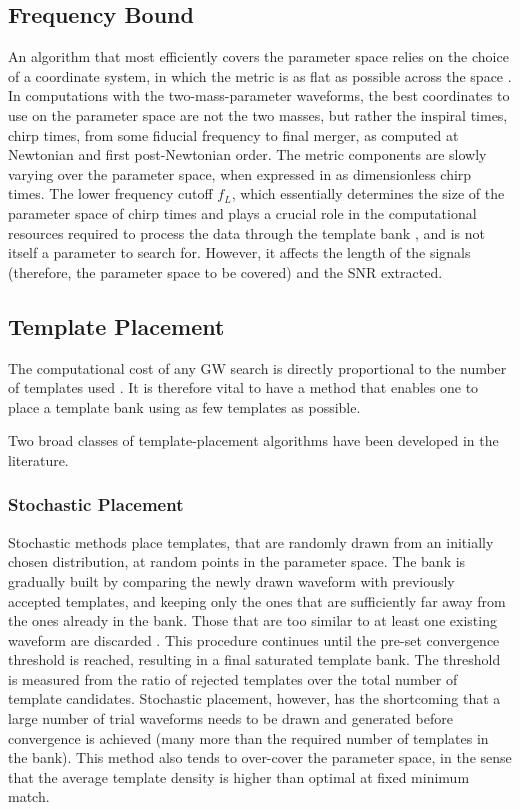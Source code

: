 \documentclass[binding=0.6cm, LaM]{sapthesis}
\begin{document}
\subsection{Frequency Bound}
	An algorithm that most efficiently covers the parameter space relies on the choice of a coordinate system, 
	in which the metric is as flat as possible across the space \cite{34}.
	In computations with the two-mass-parameter waveforms, 
	the best coordinates to use on the parameter space are not the two masses, 
	but rather the inspiral times, chirp times, from some fiducial frequency to final merger, 
	as computed at Newtonian and first post-Newtonian order. 
	The metric components are slowly varying over the parameter space, 
	when expressed in as dimensionless chirp times. 
        The lower frequency cutoff $f_L$, which essentially determines the size of the parameter space
        of chirp times and plays a crucial role in the computational resources required
        to process the data through the template bank \cite{30}, and is not itself a parameter to search for.
        However, it affects the length of the signals
        (therefore, the parameter space to be covered) and the SNR extracted.

\subsection{Template Placement}
	The computational cost of any GW search
        is directly proportional to the number of templates used \cite{28}.
	It is therefore vital to have a method that enables one 
	to place a template bank using as few templates as possible.

	Two broad classes of template-placement algorithms 
	have been developed in the literature. 

\subsubsection{Stochastic Placement}
	Stochastic methods place templates, 
	that are randomly drawn from an initially chosen distribution, 
	at random points in the parameter space.
	The bank is gradually built by comparing the newly drawn waveform
	with previously accepted templates, 
	and keeping only the ones that are sufficiently far away 
	from the ones already in the bank.
 	Those that are too similar to at least one existing waveform are discarded \cite{35}.
	This procedure continues until the pre-set convergence threshold is reached, 
	resulting in a final saturated template bank.
	The threshold is measured from the ratio of rejected templates over the total number of template candidates.
	Stochastic placement, however, has the shortcoming that 
	a large number of trial waveforms needs to be drawn and generated before convergence is achieved 
	(many more than the required number of templates in the bank). 
	This method also tends to over-cover the parameter space, 
	in the sense that the average template density is higher than optimal at fixed minimum match.
\end{document}
